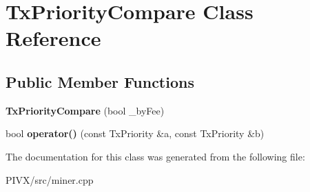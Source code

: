 \hypertarget{class_tx_priority_compare}{}\section{Tx\+Priority\+Compare Class Reference}
\label{class_tx_priority_compare}
\subsection*{Public Member Functions}
\begin{DoxyCompactItemize}
\item 
\mbox{\label{class_tx_priority_compare_a2ee1aac9d165bbeaaf2a687373f318ad}} 
{\bfseries Tx\+Priority\+Compare} (bool \+\_\+by\+Fee)
\item 
\mbox{\label{class_tx_priority_compare_ab50fdbeb5862709d13a271c11ade1775}} 
bool {\bfseries operator()} (const Tx\+Priority \&a, const Tx\+Priority \&b)
\end{DoxyCompactItemize}


The documentation for this class was generated from the following file\+:\begin{DoxyCompactItemize}
\item 
P\+I\+V\+X/src/miner.\+cpp\end{DoxyCompactItemize}
